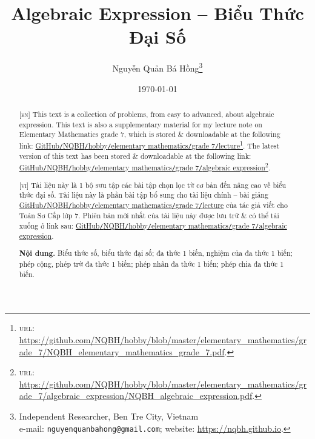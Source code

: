 \documentclass{article}
\title{Algebraic Expression -- Biểu Thức Đại Số}
\author{Nguyễn Quản Bá Hồng\footnote{Independent Researcher, Ben Tre City, Vietnam\\e-mail: \texttt{nguyenquanbahong@gmail.com}; website: \url{https://nqbh.github.io}.}}
\date{\today}
\begin{document}
\maketitle
\begin{abstract}
	\textsc{[en]} This text is a collection of problems, from easy to advanced, about algebraic expression. This text is also a supplementary material for my lecture note on Elementary Mathematics grade 7, which is stored \& downloadable at the following link: \href{https://github.com/NQBH/hobby/blob/master/elementary_mathematics/grade_7/NQBH_elementary_mathematics_grade_7.pdf}{GitHub\texttt{/}NQBH\texttt{/}hobby\texttt{/}elementary mathematics\texttt{/}grade 7\texttt{/}lecture}\footnote{\textsc{url}: \url{https://github.com/NQBH/hobby/blob/master/elementary_mathematics/grade_7/NQBH_elementary_mathematics_grade_7.pdf}.}. The latest version of this text has been stored \& downloadable at the following link: \href{https://github.com/NQBH/hobby/blob/master/elementary_mathematics/grade_7/algebraic_expression/NQBH_algebraic_expression.pdf}{GitHub\texttt{/}NQBH\texttt{/}hobby\texttt{/}elementary mathematics\texttt{/}grade 7\texttt{/}algebraic expression}\footnote{\textsc{url}: \url{https://github.com/NQBH/hobby/blob/master/elementary_mathematics/grade_7/algebraic_expression/NQBH_algebraic_expression.pdf}.}.
	\vspace{2mm}
	
	\textsc{[vi]} Tài liệu này là 1 bộ sưu tập các bài tập chọn lọc từ cơ bản đến nâng cao về biểu thức đại số. Tài liệu này là phần bài tập bổ sung cho tài liệu chính -- bài giảng \href{https://github.com/NQBH/hobby/blob/master/elementary_mathematics/grade_7/NQBH_elementary_mathematics_grade_7.pdf}{GitHub\texttt{/}NQBH\texttt{/}hobby\texttt{/}elementary mathematics\texttt{/}grade 7\texttt{/}lecture} của tác giả viết cho Toán Sơ Cấp lớp 7. Phiên bản mới nhất của tài liệu này được lưu trữ \& có thể tải xuống ở link sau: \href{https://github.com/NQBH/hobby/blob/master/elementary_mathematics/grade_7/algebraic_expression/NQBH_algebraic_expression.pdf}{GitHub\texttt{/}NQBH\texttt{/}hobby\texttt{/}elementary mathematics\texttt{/}grade 7\texttt{/}algebraic expression}.
	
	\textsf{\textbf{Nội dung.} Biểu thức số, biểu thức đại số; đa thức 1 biến, nghiệm của đa thức 1 biến; phép cộng, phép trừ đa thức 1 biến; phép nhân đa thức 1 biến; phép chia đa thức 1 biến.}
\end{abstract}
\setcounter{secnumdepth}{4}
\setcounter{tocdepth}{3}
\tableofcontents
\newpage
\end{document}
